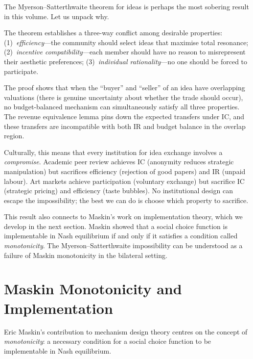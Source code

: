 \begin{remark}
The Myerson--Satterthwaite theorem for ideas is perhaps the most
sobering result in this volume.  Let us unpack why.

The theorem establishes a three-way conflict among desirable
properties: (1)~\emph{efficiency}---the community should select ideas
that maximise total resonance; (2)~\emph{incentive compatibility}---each
member should have no reason to misrepresent their aesthetic preferences;
(3)~\emph{individual rationality}---no one should be forced to participate.

The proof shows that when the ``buyer'' and ``seller'' of an idea have
overlapping valuations (there is genuine uncertainty about whether the
trade should occur), no budget-balanced mechanism can simultaneously
satisfy all three properties.  The revenue equivalence lemma pins down
the expected transfers under IC, and these transfers are incompatible
with both IR and budget balance in the overlap region.

Culturally, this means that every institution for idea exchange involves
a \emph{compromise}.  Academic peer review achieves IC (anonymity
reduces strategic manipulation) but sacrifices efficiency (rejection
of good papers) and IR (unpaid labour).  Art markets achieve
participation (voluntary exchange) but sacrifice IC (strategic pricing)
and efficiency (taste bubbles).  No institutional design can escape
the impossibility; the best we can do is choose which property to
sacrifice.

This result also connects to Maskin's work on implementation theory,
which we develop in the next section.  Maskin showed that a social
choice function is implementable in Nash equilibrium if and only if it
satisfies a condition called \emph{monotonicity}.  The Myerson--Satterthwaite
impossibility can be understood as a failure of Maskin monotonicity in
the bilateral setting.
\end{remark}

\section{Maskin Monotonicity and Implementation}
\label{sec:maskin}

Eric Maskin's contribution to mechanism design theory centres on
the concept of \emph{monotonicity}: a necessary condition for a
social choice function to be implementable in Nash equilibrium.

